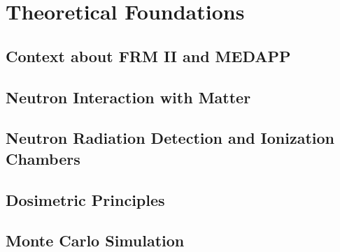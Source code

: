 \chapter{Theoretical Foundations}
\section{Context about FRM II and MEDAPP}

\section{Neutron Interaction with Matter}
\label{section: Neutron intreraction with matter}

\section{Neutron Radiation Detection and Ionization Chambers}

\section{Dosimetric Principles}

\section{Monte Carlo Simulation}
